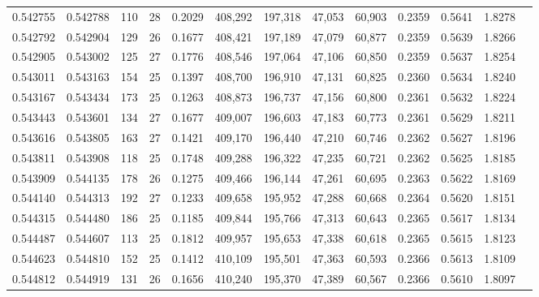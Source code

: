 \begin{tabular}{rrrrrrrrrrrrr}
0.542755 & 0.542788 &   110 &  28 &                                     0.2029 & 408,292 & 197,318 &  47,053 &  60,903 & 0.2359 & 0.5641 & 1.8278 \\
0.542792 & 0.542904 &   129 &  26 &                                     0.1677 & 408,421 & 197,189 &  47,079 &  60,877 & 0.2359 & 0.5639 & 1.8266 \\
0.542905 & 0.543002 &   125 &  27 &                                     0.1776 & 408,546 & 197,064 &  47,106 &  60,850 & 0.2359 & 0.5637 & 1.8254 \\
0.543011 & 0.543163 &   154 &  25 &                                     0.1397 & 408,700 & 196,910 &  47,131 &  60,825 & 0.2360 & 0.5634 & 1.8240 \\
0.543167 & 0.543434 &   173 &  25 &                                     0.1263 & 408,873 & 196,737 &  47,156 &  60,800 & 0.2361 & 0.5632 & 1.8224 \\
0.543443 & 0.543601 &   134 &  27 &                                     0.1677 & 409,007 & 196,603 &  47,183 &  60,773 & 0.2361 & 0.5629 & 1.8211 \\
0.543616 & 0.543805 &   163 &  27 &                                     0.1421 & 409,170 & 196,440 &  47,210 &  60,746 & 0.2362 & 0.5627 & 1.8196 \\
0.543811 & 0.543908 &   118 &  25 &                                     0.1748 & 409,288 & 196,322 &  47,235 &  60,721 & 0.2362 & 0.5625 & 1.8185 \\
0.543909 & 0.544135 &   178 &  26 &                                     0.1275 & 409,466 & 196,144 &  47,261 &  60,695 & 0.2363 & 0.5622 & 1.8169 \\
0.544140 & 0.544313 &   192 &  27 &                                     0.1233 & 409,658 & 195,952 &  47,288 &  60,668 & 0.2364 & 0.5620 & 1.8151 \\
0.544315 & 0.544480 &   186 &  25 &                                     0.1185 & 409,844 & 195,766 &  47,313 &  60,643 & 0.2365 & 0.5617 & 1.8134 \\
0.544487 & 0.544607 &   113 &  25 &                                     0.1812 & 409,957 & 195,653 &  47,338 &  60,618 & 0.2365 & 0.5615 & 1.8123 \\
0.544623 & 0.544810 &   152 &  25 &                                     0.1412 & 410,109 & 195,501 &  47,363 &  60,593 & 0.2366 & 0.5613 & 1.8109 \\
0.544812 & 0.544919 &   131 &  26 &                                     0.1656 & 410,240 & 195,370 &  47,389 &  60,567 & 0.2366 & 0.5610 & 1.8097 \\

\end{tabular}
